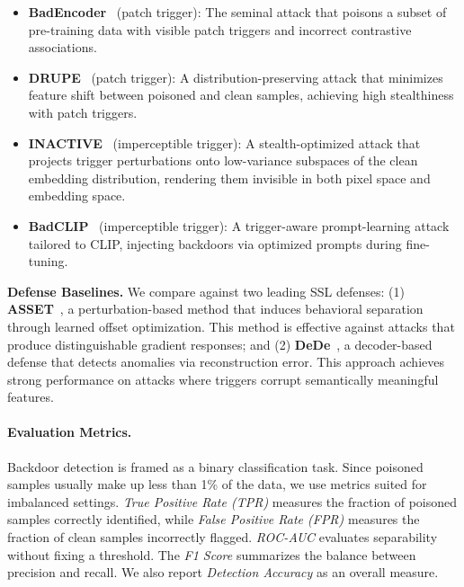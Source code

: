 \documentclass[letterpaper,twocolumn,10pt]{article}
\begin{document}
\begin{itemize}[leftmargin=0pt]
    \item \textbf{BadEncoder}~\cite{jia2022badencoder} (patch trigger): The seminal attack that poisons a subset of pre-training data with visible patch triggers and incorrect contrastive associations.
    \item \textbf{DRUPE}~\cite{tao2024distribution} (patch trigger): A distribution-preserving attack that minimizes feature shift between poisoned and clean samples, achieving high stealthiness with patch triggers.
    \item \textbf{INACTIVE}~\cite{zhang2025invisible} (imperceptible trigger): A stealth-optimized attack that projects trigger perturbations onto low-variance subspaces of the clean embedding distribution, rendering them invisible in both pixel space and embedding space.
    \item \textbf{BadCLIP}~\cite{liang2024badclip} (imperceptible trigger): A trigger-aware prompt-learning attack tailored to CLIP, injecting backdoors via optimized prompts during fine-tuning.
\end{itemize}

\par \textbf{Defense Baselines.}
We compare against two leading SSL defenses: (1) \textbf{ASSET}~\cite{asset}, a perturbation-based method that induces behavioral separation through learned offset optimization. This method is effective against attacks that produce distinguishable gradient responses; and (2) \textbf{DeDe}~\cite{hou2025dede}, a decoder-based defense that detects anomalies via reconstruction error. This approach achieves strong performance on attacks where triggers corrupt semantically meaningful features.

\paragraph{Evaluation Metrics.}
Backdoor detection is framed as a binary classification task. Since poisoned samples usually make up less than 1\% of the data, we use metrics suited for imbalanced settings. \textit{True Positive Rate (TPR)} measures the fraction of poisoned samples correctly identified, while \textit{False Positive Rate (FPR)} measures the fraction of clean samples incorrectly flagged. \textit{ROC-AUC} evaluates separability without fixing a threshold. The \textit{F1 Score} summarizes the balance between precision and recall. We also report \textit{Detection Accuracy} as an overall measure.
\end{document}
